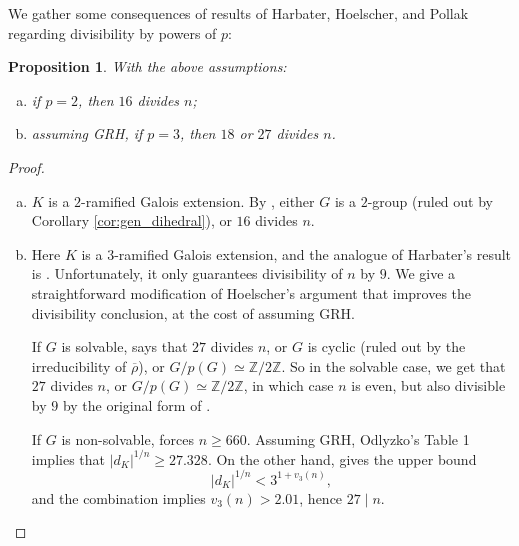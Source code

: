 \documentclass{amsart}
\newtheorem{prop}[theorem]{Proposition}
\theoremstyle{definition}
\newcommand{\Z}{\mathbb{Z}}
\newcommand{\br}{\overline{\rho}}
\renewcommand{\geq}{\geqslant}
\begin{document}
We gather some consequences of results of Harbater, Hoelscher, and Pollak regarding divisibility by powers of $p$:
\begin{prop}\label{prop:divisibility}
  With the above assumptions:
  \begin{enumerate}[(a)]
    \item if $p=2$, then $16$ divides $n$;
    \item assuming GRH, if $p=3$, then $18$ or $27$ divides $n$.
  \end{enumerate}
\end{prop}
\begin{proof}
  \
  \begin{enumerate}[(a)]
    \item $K$ is a $2$-ramified Galois extension.
      By \cite[Theorem 2.23]{Ha}, either $G$ is a $2$-group (ruled out by Corollary \ref{cor:gen_dihedral}), or $16$ divides $n$.
    \item Here $K$ is a $3$-ramified Galois extension, and the analogue of Harbater's result is \cite[Corollary E]{Ho}.
      Unfortunately, it only guarantees divisibility of $n$ by $9$.
      We give a straightforward modification of Hoelscher's argument that improves the divisibility conclusion, at the cost of assuming GRH.

      If $G$ is solvable, \cite[Corollary D]{Ho} says that $27$ divides $n$, or $G$ is cyclic (ruled out by the irreducibility of $\br$), or $G/p(G)\simeq \Z/2\Z$.
      So in the solvable case, we get that $27$ divides $n$, or $G/p(G)\simeq \Z/2\Z$, in which case $n$ is even, but also divisible by $9$ by the original form of \cite[Corollary E]{Ho}.

      If $G$ is non-solvable, \cite[Theorem 2.10]{Po} forces $n\geq 660$.
      Assuming GRH, Odlyzko's Table 1 implies that $|d_K|^{1/n}\geq 27.328$.
      On the other hand, \cite[Theorem III.2.6]{Ne} gives the upper bound
      \begin{equation*}
        |d_K|^{1/n}< 3^{1+v_3(n)},
      \end{equation*}
      and the combination implies $v_3(n)>2.01$, hence $27\mid n$.\qedhere
  \end{enumerate}
\end{proof}
\end{document}
